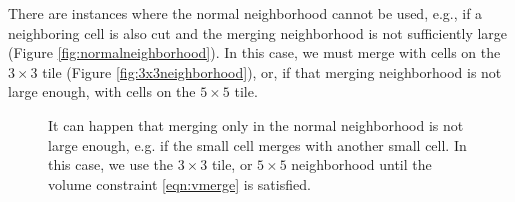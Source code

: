\begin{itemize}
There are instances where the normal neighborhood cannot be used, e.g., if a neighboring cell is also cut and the
merging neighborhood is not sufficiently large (Figure \ref{fig:normalneighborhood}).  In this case, we must merge with cells on the $3\times3$ tile (Figure \ref{fig:3x3neighborhood}), or, if that merging neighborhood is not large enough, with cells on the $5 \times 5$ tile.

\begin{figure}[h]
\hspace*{.5in}
	\hfill
	\caption{\sf It can happen that merging only in the normal neighborhood is not 
        large enough, e.g. if the small cell merges with another small cell.  
        In this case, we use the $3\times 3$ tile, or $5\times5$ neighborhood 
        until the volume constraint \eqref{eqn:vmerge} is satisfied.}
\end{figure}


\end{itemize}
